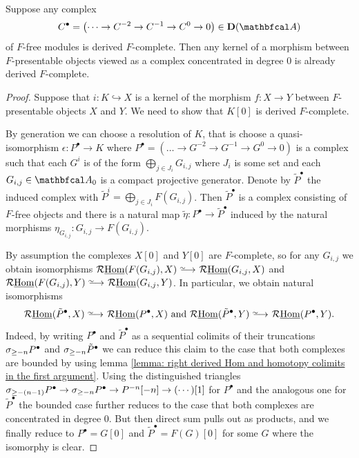 \begin{lemma}
	\label{lemma: kernels of F-free objects are complete}
	
	Suppose any complex
		$$C^\bullet = \left(\dots \to C^{-2} \to C^{-1} \to C^0 \to 0\right) \in \derived{\category A}$$
	of $F$-free modules is derived $F$-complete. Then any kernel of a morphism between $F$-presentable objects viewed as a complex concentrated in degree $0$ is already derived $F$-complete.
\end{lemma}
\begin{proof}
	Suppose that $i \colon K \hookrightarrow X$ is a kernel of the morphism $f\colon X\to Y$ between $F$-presentable objects $X$ and $Y$. We need to show that $K[0]$ is derived $F$-complete.
	
	By generation we can choose a resolution of $K$, that is choose a quasi-isomorphism $\epsilon\colon P^\bullet \to K$ where $P^\bullet = (\dots\to G^{-2} \to G^{-1} \to G^0 \to 0)$ is a complex such that each $G^i$ is of the form $\bigoplus_{j\in J_i} G_{i, j}$ where $J_i$ is some set and each $G_{i, j}\in\category A_0$ is a compact projective generator. Denote by $\tilde P^\bullet$ the induced complex with $\tilde P^i = \bigoplus_{j\in J_i} F(G_{i, j})$. Then $\tilde P^\bullet$ is a complex consisting of $F$-free objects and there is a natural map $\tilde \eta\colon P^\bullet\to \tilde P^\bullet$ induced by the natural morphisms $\eta_{G_{i, j}}\colon G_{i,j}\to F(G_{i, j})$.
	
	By assumption the complexes $X[0]$ and $Y[0]$ are $F$-complete, so for any $G_{i,j}$ we obtain isomorphisms $\eRHom(F(G_{i,j}), X)\isorightarrow \eRHom(G_{i,j}, X)$ and $\eRHom(F(G_{i,j}), Y)\isorightarrow \eRHom(G_{i,j}, Y)$. In particular, we obtain natural isomorphisms
		$$\eRHom(\tilde P^\bullet, X)\isorightarrow \eRHom(P^\bullet, X)\text{ and }\eRHom(\tilde P^\bullet, Y)\isorightarrow \eRHom(P^\bullet, Y).$$
	Indeed, by writing $P^\bullet$ and $\tilde P^\bullet$ as a sequential colimits of their truncations ${\sigma_{\ge -n}}P^\bullet$ and ${\sigma_{\ge -n}}\tilde P^\bullet$ we can reduce this claim to the case that both complexes are bounded by using lemma \ref{lemma: right derived Hom and homotopy colimits in the first argument}. Using the distinguished triangles ${\sigma_{\ge -(n-1)}}P^\bullet \to {\sigma_{\ge -n}}P^\bullet \to P^{-n}[-n] \to (\cdots)[1]$ for $P^\bullet$ and the analogous one for $\tilde P^\bullet$ the bounded case further reduces to the case that both complexes are concentrated in degree $0$. But then direct sum pulls out as products, and we finally reduce to $P^\bullet = G[0]$ and $\tilde P^\bullet = F(G)[0]$ for some $G$ where the isomorphy is clear.
	

\end{proof}
